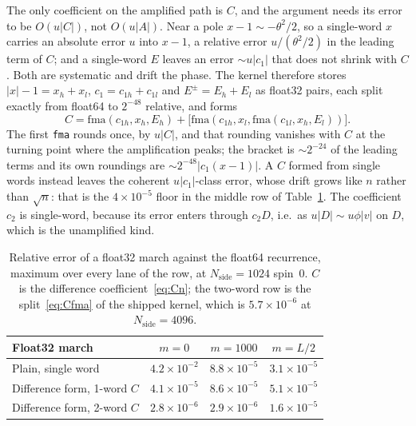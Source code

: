 \documentclass[usenatbib,useAMS]{mnras}
\begin{document}
The only coefficient on the amplified path is $C$, and the argument needs its error to be $O(u\lvert C\rvert)$, not $O(u\lvert A\rvert)$. Near a pole $x-1\sim-\theta^2/2$, so a single-word $x$ carries an absolute error $u$ into $x-1$, a relative error $u/(\theta^2/2)$ in the leading term of $C$; and a single-word $E$ leaves an error $\sim u\lvert c_1\rvert$ that does not shrink with $C$. Both are systematic and drift the phase. The kernel therefore stores $\lvert x\rvert-1=x_h+x_l$, $c_1=c_{1h}+c_{1l}$ and $E^\pm=E_h+E_l$ as float32 pairs, each split exactly from float64 to $2^{-48}$ relative, and forms
\begin{equation}
\label{eq:Cfma}
  C=\mathrm{fma}(c_{1h},x_h,E_h)+\bigl[\mathrm{fma}(c_{1h},x_l,\mathrm{fma}(c_{1l},x_h,E_l))\bigr].
\end{equation}
The first \texttt{fma} rounds once, by $u\lvert C\rvert$, and that rounding vanishes with $C$ at the turning point where the amplification peaks; the bracket is $\sim2^{-24}$ of the leading terms and its own roundings are $\sim2^{-48}\lvert c_1(x-1)\rvert$. A $C$ formed from single words instead leaves the coherent $u\lvert c_1\rvert$-class error, whose drift grows like $n$ rather than $\sqrt{n}$: that is the $4\times10^{-5}$ floor in the middle row of Table~\ref{tab:dform}. The coefficient $c_2$ is single-word, because its error enters through $c_2D$, i.e.\ as $u\lvert D\rvert\sim u\phi\lvert v\rvert$ on $D$, which is the unamplified kind.

\begin{table}
\centering
\caption{Relative error of a float32 march against the float64 recurrence, maximum over every lane of the row, at $N_{\mathrm{side}}=1024$ spin~$0$. $C$ is the difference coefficient~\eqref{eq:Cn}; the two-word row is the split~\eqref{eq:Cfma} of the shipped kernel, which is $5.7\times10^{-6}$ at $N_{\mathrm{side}}=4096$.}
\label{tab:dform}
\footnotesize
\setlength{\tabcolsep}{3pt}
\begin{tabular}{@{}lccc@{}}
\toprule
Float32 march & $m=0$ & $m=1000$ & $m=L/2$ \\
\midrule
Plain, single word          & $4.2\times10^{-2}$ & $8.8\times10^{-5}$ & $3.1\times10^{-5}$ \\
Difference form, 1-word $C$ & $4.1\times10^{-5}$ & $8.6\times10^{-5}$ & $5.1\times10^{-5}$ \\
Difference form, 2-word $C$ & $2.8\times10^{-6}$ & $2.9\times10^{-6}$ & $1.6\times10^{-5}$ \\
\bottomrule
\end{tabular}
\end{table}
\end{document}
